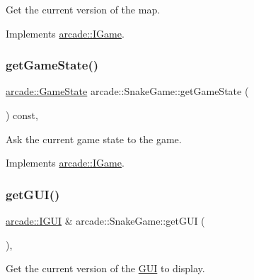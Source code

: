Get the current version of the map. 



Implements \hyperlink{classarcade_1_1_i_game_a2e1791071bf65ee35e249e409ee29044}{arcade\+::\+I\+Game}.

\mbox{\label{classarcade_1_1_snake_game_afcd7d113f2187cd34396022af4e9e10c}} 
\subsubsection{\texorpdfstring{get\+Game\+State()}{getGameState()}}
{\footnotesize\ttfamily \hyperlink{namespacearcade_a6adca89ee2f539b03980c7e59b044ed7}{arcade\+::\+Game\+State} arcade\+::\+Snake\+Game\+::get\+Game\+State (\begin{DoxyParamCaption}{ }\end{DoxyParamCaption}) const\hspace{0.3cm}{\ttfamily [override]}, {\ttfamily [virtual]}}



Ask the current game state to the game. 



Implements \hyperlink{classarcade_1_1_i_game_a75083f0465c0ccbdbbb38c689b4a694c}{arcade\+::\+I\+Game}.

\mbox{\label{classarcade_1_1_snake_game_ab586312d56bab5be7e1506fa513fea44}} 
\subsubsection{\texorpdfstring{get\+G\+U\+I()}{getGUI()}}
{\footnotesize\ttfamily \hyperlink{classarcade_1_1_i_g_u_i}{arcade\+::\+I\+G\+UI} \& arcade\+::\+Snake\+Game\+::get\+G\+UI (\begin{DoxyParamCaption}{ }\end{DoxyParamCaption})\hspace{0.3cm}{\ttfamily [override]}, {\ttfamily [virtual]}}



Get the current version of the \hyperlink{classarcade_1_1_g_u_i}{G\+UI} to display. 



